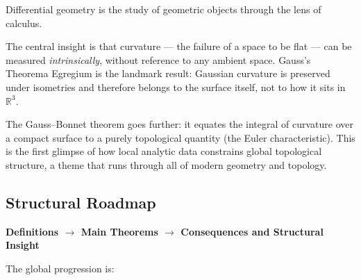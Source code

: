 

\begin{tcolorbox}[
  colback=gray!6,
  colframe=gray!40,
  arc=2pt,
  left=8pt, right=8pt, top=6pt, bottom=6pt,
  title={\small\textbf{Structural Role: Differential Geometry — Calculus on Curved Spaces}},
  fonttitle=\small\bfseries
]
Differential geometry is the study of geometric objects through
the lens of calculus.

The central insight is that curvature --- the failure of a space
to be flat --- can be measured \emph{intrinsically}, without
reference to any ambient space.
Gauss's Theorema Egregium is the landmark result: Gaussian
curvature is preserved under isometries and therefore belongs
to the surface itself, not to how it sits in $\mathbb{R}^3$.

The Gauss--Bonnet theorem goes further: it equates the
integral of curvature over a compact surface to a purely
topological quantity (the Euler characteristic).
This is the first glimpse of how local analytic data
constrains global topological structure, a theme that runs
through all of modern geometry and topology.
\end{tcolorbox}
\vspace{1em}

\subsection*{Structural Roadmap}

\begin{center}
\textbf{Definitions $\longrightarrow$ Main Theorems
$\longrightarrow$ Consequences and Structural Insight}
\end{center}

The global progression is:

